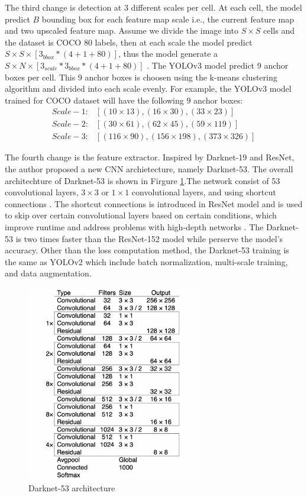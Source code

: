 The third change is detection at 3 different scales per cell. At each cell, the model predict $B$ bounding box for each feature map scale i.e., the current feature map and two upscaled feature map. Assume we divide the image into $S \times S$ cells and the dataset is COCO 80 labels, then at each scale the model predict $S \times S \times [3_{bbox} * (4 + 1 + 80)]$, thus the model generate a $S \times N \times [3_{scale} * 3_{bbox} * (4 + 1 + 80)]$ \cite{yolov3_2018}. The YOLOv3 model predict 9 anchor boxes per cell. This 9 anchor boxes is choosen using the k-means clustering algorithm and divided into each scale evenly. For example, the YOLOv3 model trained for COCO dataset will have the following 9 anchor boxes:
\begin{align*}
    Scale-1: &[(10 \times 13), (16 \times 30), (33 \times 23)] \\
    Scale-2: &[(30 \times 61), (62 \times 45), (59 \times 119)] \\
    Scale-3: &[(116  \times  90), (156  \times  198), (373  \times  326)]    
\end{align*}
    
The fourth change is the feature extractor. Inspired by Darknet-19 and ResNet, the author proposed a new CNN archietecture, namely Darknet-53. The overall architechture of Darknet-53 is shown in Firgure \ref{fig:darknet53_archite}.The network consist of 53 convolutional layers, $3 \times 3$ or $1 \times 1$ convolutional layers, and using shortcut connections \cite{yolov3_2018}. The shortcut connections is introduced in ResNet model and is used to skip over certain convolutional layers based on certain conditions, which improve runtime and address problems with high-depth networks \cite{resnet_2016}. The Darknet-53 is two times faster than the ResNet-152 model while perserve the model's accuracy. Other than the loss computation method, the Darknet-53 training is the same as YOLOv2 which include batch normalization, multi-scale training, and data augmentation.
\begin{figure}[!ht]
    \centering
    \includegraphics[width=3in]{figures/darknet53_archite.png}
    \caption{Darknet-53 architecture \cite{yolov3_2018}} 
    \label{fig:darknet53_archite}
\end{figure}